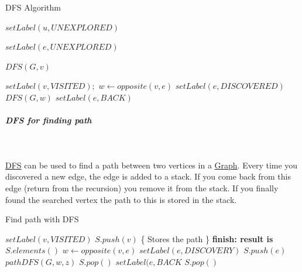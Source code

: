 \documentclass[11pt,twoside,twocolumn,landscape]{article}
\begin{document}
\begin{algorithm}
  \caption{DFS Algorithm}
  \begin{algorithmic}[1]
    \State $setLabel(u, UNEXPLORED)$
    \EndFor

    \State $setLabel(e, UNEXPLORED)$
    \EndFor

    \State $DFS(G, v)$
    \EndIf
    \EndFor
    \EndProcedure
  \end{algorithmic}
  \begin{algorithmic}[1]
    \State $setLabel(v, VISITED);$
    \State $w \leftarrow opposite(v,e)$
    \State $setLabel(e, DISCOVERED)$
    \State $DFS(G, w)$
    \Else
    \State $setLabel(e, BACK)$
    \EndIf
    \EndIf
    \EndFor
    \EndProcedure
  \end{algorithmic}
\end{algorithm}

\subparagraph{DFS for finding path} \
\label{sec:orga1d3165}

\href{../../../roam/20220202095038-dfs.org}{DFS} can be used to find a path between two vertices in a \href{../../../roam/20220201163000-graph.org}{Graph}.
Every time you discovered a new edge, the edge is added to a stack.
If you come back from this edge (return from the recursion) you remove it from the stack.
If you finally found the searched vertex the path to this is stored in the stack.




\begin{algorithm}
  \caption{Find path with DFS}
  \begin{algorithmic}[1]
    \State $setLabel(v, VISITED)$
    \State $S.push(v)$ \{ Stores the path \}
    \State \textbf{finish: result is} $S.elements()$
    \EndIf
    \State $w \leftarrow opposite(v, e)$
    \State $setLabel(e, DISCOVERY)$
    \State $S.push(e)$
    \State $pathDFS(G, w, z)$
    \State $S.pop()$
    \Else
    \State $setLabel(e, BACK$
    \EndIf
    \EndIf
    \EndFor
    \State $S.pop()$
    \EndProcedure
  \end{algorithmic}
\end{algorithm}
\end{document}
